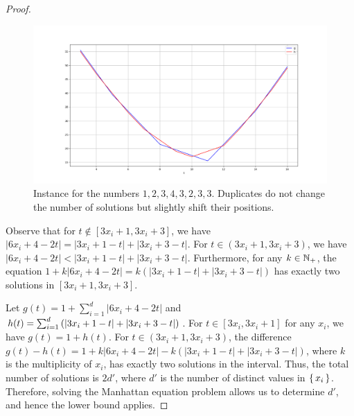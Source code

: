 \begin{proof}
	\begin{figure}
	  \centering
	  \includegraphics[scale=1, width=0.9\linewidth]{figures/manhattan-eq-red-2.png}
	  \caption{Instance for the numbers \(1,2,3,4,3,2,3,3\). Duplicates do not change the number of solutions but slightly shift their positions.}
	  \label{fig:manhattan-eq-red-2}
	\end{figure}

	Observe that for \(t \notin [3x_i + 1, 3x_i + 3]\), we have \(|6x_i + 4 - 2t| = |3x_i + 1 - t| + |3x_i + 3 - t|\). For \(t \in (3x_i + 1, 3x_i + 3)\), we have \(|6x_i + 4 - 2t| < |3x_i + 1 - t| + |3x_i + 3 - t|\). Furthermore, for any \(k \in \mathbb{N}_+\), the equation \(1 + k|6x_i + 4 - 2t| = k(|3x_i + 1 - t| + |3x_i + 3 - t|)\) has exactly two solutions in \([3x_i+1, 3x_i+3]\).

	Let \(g(t) = 1 + \sum_{i=1}^d |6x_i + 4 - 2t|\) and \(h(t) = \sum_{i=1}^d \left(|3x_i + 1 - t| + |3x_i + 3 - t|\right)\). For \(t \in [3x_i, 3x_i + 1]\) for any \(x_i\), we have \(g(t) = 1 + h(t)\). For \(t \in (3x_i+1, 3x_i + 3)\), the difference \(g(t) - h(t) = 1 + k|6x_i + 4 - 2t| - k(|3x_i + 1 - t| + |3x_i + 3 - t|)\), where \(k\) is the multiplicity of \(x_i\), has exactly two solutions in the interval. Thus, the total number of solutions is \(2d'\), where \(d'\) is the number of distinct values in \(\set{x_i}\). Therefore, solving the Manhattan equation problem allows us to determine \(d'\), and hence the lower bound applies.
\end{proof}
